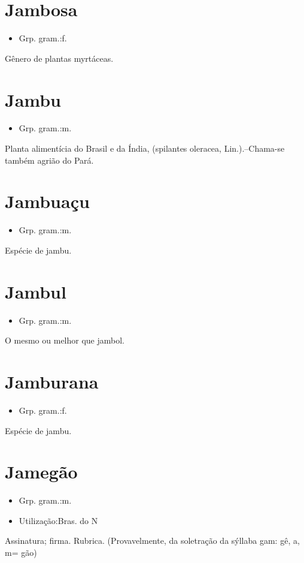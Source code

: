 \documentclass{article}
\begin{document}
\section{Jambosa}
\begin{itemize}
\item {Grp. gram.:f.}
\end{itemize}
Gênero de plantas myrtáceas.
\section{Jambu}
\begin{itemize}
\item {Grp. gram.:m.}
\end{itemize}
Planta alimentícia do Brasil e da Índia, (\textunderscore spilantes oleracea\textunderscore , Lin.).--Chama-se também \textunderscore agrião do Pará\textunderscore .
\section{Jambuaçu}
\begin{itemize}
\item {Grp. gram.:m.}
\end{itemize}
Espécie de jambu.
\section{Jambul}
\begin{itemize}
\item {Grp. gram.:m.}
\end{itemize}
O mesmo ou melhor que \textunderscore jambol\textunderscore .
\section{Jamburana}
\begin{itemize}
\item {Grp. gram.:f.}
\end{itemize}
Espécie de jambu.
\section{Jamegão}
\begin{itemize}
\item {Grp. gram.:m.}
\end{itemize}
\begin{itemize}
\item {Utilização:Bras. do N}
\end{itemize}
Assinatura; firma.
Rubrica.
(Provavelmente, da soletração da sýllaba \textunderscore gam\textunderscore : \textunderscore gê\textunderscore , \textunderscore a\textunderscore , \textunderscore m\textunderscore  = \textunderscore gão\textunderscore )
\end{document}
